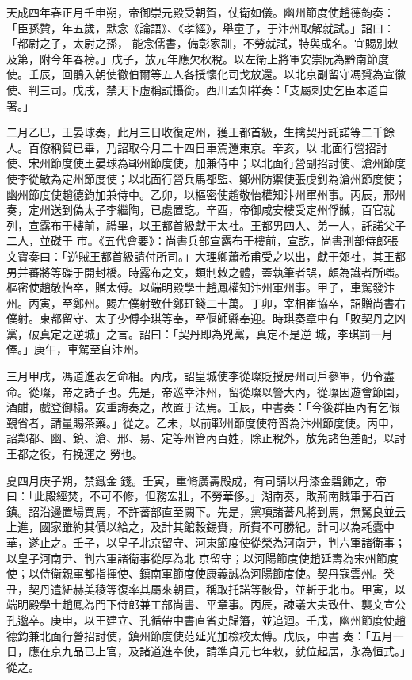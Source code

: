 
\begin{pinyinscope}

 天成四年春正月壬申朔，帝御崇元殿受朝賀，仗衛如儀。幽州節度使趙德鈞奏：「臣孫贊，年五歲，默念《論語》、《孝經》，舉童子，于汴州取解就試。」詔曰：「都尉之子，太尉之孫，
 能念儒書，備彰家訓，不勞就試，特與成名。宜賜別敕及第，附今年春榜。」戊子，放元年應欠秋稅。以左衛上將軍安崇阮為黔南節度使。壬辰，回鶻入朝使徹伯爾等五人各授懷化司戈放還。以北京副留守馮贇為宣徽使、判三司。戊戌，禁天下虛稱試攝銜。西川孟知祥奏：「支屬刺史乞臣本道自署。」



 二月乙巳，王晏球奏，此月三日收復定州，獲王都首級，生擒契丹託諾等二千餘人。百僚稱賀已畢，乃詔取今月二十四日車駕還東京。辛亥，以
 北面行營招討使、宋州節度使王晏球為鄆州節度使，加兼侍中；以北面行營副招討使、滄州節度使李從敏為定州節度使；以北面行營兵馬都監、鄭州防禦使張虔釗為滄州節度使；幽州節度使趙德鈞加兼侍中。乙卯，以樞密使趙敬怡權知汴州軍州事。丙辰，邢州奏，定州送到偽太子李繼陶，已處置訖。辛酉，帝御咸安樓受定州俘馘，百官就列，宣露布于樓前，禮畢，以王都首級獻于太社。王都男四人、弟一人，託諾父子二人，並磔于
 市。《五代會要》：尚書兵部宣露布于樓前，宣訖，尚書刑部侍郎張文寶奏曰：「逆賊王都首級請付所司。」大理卿蕭希甫受之以出，獻于郊社，其王都男并蕃將等磔于開封橋。時露布之文，類制敕之體，蓋執筆者誤，頗為識者所嗤。樞密使趙敬怡卒，贈太傅。以端明殿學士趙鳳權知汴州軍州事。甲子，車駕發汴州。丙寅，至鄭州。賜左僕射致仕鄭玨錢二十萬。丁卯，宰相崔協卒，詔贈尚書右僕射。東都留守、太子少傅李琪等奉，至偃師縣奉迎。時琪奏章中有「敗契丹之凶黨，破真定之逆城」之言。詔曰：「契丹即為兇黨，真定不是逆
 城，李琪罰一月俸。」庚午，車駕至自汴州。



 三月甲戌，馮道進表乞命相。丙戌，詔皇城使李從璨貶授房州司戶參軍，仍令盡命。從璨，帝之諸子也。先是，帝巡幸汴州，留從璨以警大內，從璨因遊會節園，酒酣，戲登御榻。安重誨奏之，故置于法焉。壬辰，中書奏：「今後群臣內有乞假覲省者，請量賜茶藥。」從之。乙未，以前鄆州節度使符習為汴州節度使。丙申，詔鄴都、幽、鎮、滄、邢、易、定等州管內百姓，除正稅外，放免諸色差配，以討王都之役，有挽運之
 勞也。



 夏四月庚子朔，禁鐵金錢。壬寅，重脩廣壽殿成，有司請以丹漆金碧飾之，帝曰：「此殿經焚，不可不修，但務宏壯，不勞華侈。」湖南奏，敗荊南賊軍于石首鎮。詔沿邊置場買馬，不許蕃部直至闕下。先是，黨項諸蕃凡將到馬，無駑良並云上進，國家雖約其價以給之，及計其館穀錫賚，所費不可勝紀。計司以為耗蠹中華，遂止之。壬子，以皇子北京留守、河東節度使從榮為河南尹，判六軍諸衛事；以皇子河南尹、判六軍諸衛事從厚為北
 京留守；以河陽節度使趙延壽為宋州節度使；以侍衛親軍都指揮使、鎮南軍節度使康義誠為河陽節度使。契丹寇雲州。癸丑，契丹遣紐赫美稜等復率其屬來朝貢，稱取托諾等骸骨，並斬于北市。甲寅，以端明殿學士趙鳳為門下侍郎兼工部尚書、平章事。丙辰，諫議大夫致仕、襲文宣公孔邈卒。庚申，以王建立、孔循帶中書直省吏歸籓，並追迴。壬戌，幽州節度使趙德鈞兼北面行營招討使，鎮州節度使范延光加檢校太傅。戊辰，中書
 奏：「五月一日，應在京九品已上官，及諸道進奉使，請準貞元七年敕，就位起居，永為恒式。」從之。




\end{pinyinscope}
